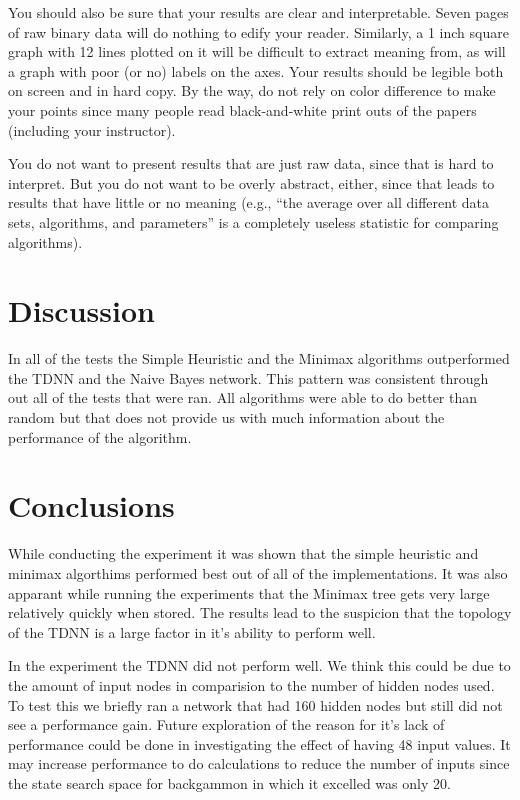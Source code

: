 \documentclass[12pt,letterpaper]{article}
\begin{document}
You should also be sure that your results are clear and interpretable.  Seven
pages of raw binary data will do nothing to edify your reader.  Similarly, a
1 inch square graph with 12 lines plotted on it will be difficult to extract
meaning from, as will a graph with poor (or no) labels on the axes.  Your
results should be legible both on screen and in hard copy. By the way, do
not rely on color difference to make your points since many people read
black-and-white print outs of the papers (including your instructor).

You do not want to present results that are just raw data, since that is hard to
interpret.  But you do not want to be overly abstract, either, since that leads to
results that have little or no meaning (e.g., ``the average over all different
data sets, algorithms, and parameters'' is a completely useless statistic for
comparing algorithms).

\section{Discussion}
In all of the tests the Simple Heuristic and the Minimax algorithms outperformed the TDNN and the Naive Bayes network. This pattern was consistent through out all of the tests that were ran. All algorithms were able to do better than random but that does not provide us with much information about the performance of the algorithm. 

\section{Conclusions}
While conducting the experiment it was shown that the simple heuristic and minimax algorthims performed best out of all of the implementations. It was also apparant while running the experiments that the Minimax tree gets very large relatively quickly when stored. The results lead to the suspicion that the topology of the TDNN is a large factor in it's ability to perform well.

In the experiment the TDNN did not perform well. We think this could be due to the amount of input nodes in comparision to the number of hidden nodes used. To test this we briefly ran a network that had 160 hidden nodes but still did not see a performance gain. Future exploration of the reason for it's lack of performance could be done in investigating the effect of having 48 input values. It may increase performance to do calculations to reduce the number of inputs since the state search space for backgammon in which it excelled was only 20. 



\newpage



\nocite{*}
\end{document}
